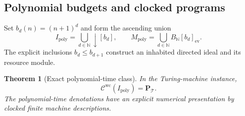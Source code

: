 \documentclass[11pt,a4paper]{article}
\numberwithin{algorithm}{section}
\numberwithin{equation}{section}
\newtheorem{theorem}{Theorem}[section]
\theoremstyle{definition}
\theoremstyle{remark}
\theoremstyle{plain}
\newcommand{\N}{\mathbb N}
\theoremstyle{definition}
\theoremstyle{plain}
\begin{document}
\subsection{Polynomial budgets and clocked programs}

Set $b_d(n)=(n+1)^d$ and form the ascending union
\[
 I_{\mathrm{poly}}=\bigcup_{d\in\N}\downarrow[b_d],
 \qquad M_{\mathrm{poly}}=\bigcup_{d\in\N}B_\N[b_d]_{\mathrm{ev}}.
\]
The explicit inclusions $b_d\le b_{d+1}$ construct an inhabited
directed ideal and its resource module.

\begin{theorem}[Exact polynomial-time class]
\label{thm:wc-p}
In the Turing-machine instance,
\[
 \mathcal C^{\mathrm{wc}}(I_{\mathrm{poly}})=\mathbf P_{\mathcal T}.
\]
The polynomial-time denotations have an explicit numerical presentation
by clocked finite machine descriptions.
\end{theorem}
\end{document}
